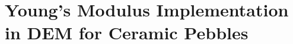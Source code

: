 \section{Young's Modulus Implementation in DEM for Ceramic Pebbles}\label{sec:exp-reduction-factor}











